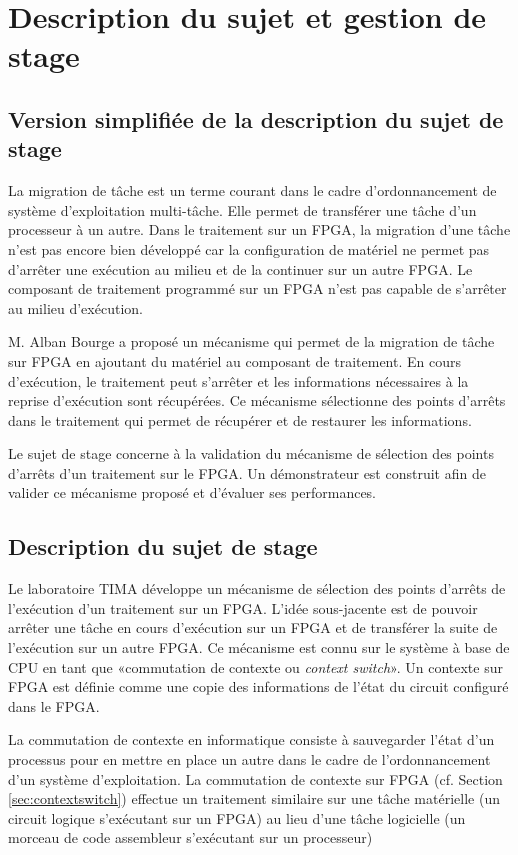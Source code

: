 \chapter{Description du sujet et gestion de stage}
\label{chap:sujet}
\OnehalfSpacing
\section{Version simplifiée de la description du sujet de stage}

La migration de tâche est un terme courant dans le cadre d'ordonnancement 
de système d'exploitation multi-tâche. Elle permet de transférer une tâche
d'un processeur à un autre. Dans le traitement sur un FPGA, la migration d'une tâche
n'est pas encore bien développé car la configuration de matériel ne permet pas
d'arrêter une exécution au milieu et de la continuer sur un autre FPGA. Le composant
de traitement programmé sur un FPGA n'est pas capable de s'arrêter au milieu d'exécution.

M. Alban Bourge a proposé un mécanisme qui permet de la migration de tâche sur
FPGA en ajoutant du matériel au composant de traitement. 
En cours d'exécution, le traitement peut s'arrêter et les informations nécessaires
à la reprise d'exécution sont récupérées. Ce mécanisme sélectionne des points d'arrêts
dans le traitement qui permet de récupérer et de restaurer les informations.

Le sujet de stage concerne à la validation du mécanisme de sélection des points d'arrêts d'un traitement
sur le FPGA. Un démonstrateur est construit afin de valider ce mécanisme proposé et d'évaluer
ses performances.

\section{Description du sujet de stage}
\label{sec:sujet}

Le laboratoire TIMA développe un mécanisme de sélection des points
d'arrêts de l'exécution d'un traitement sur un FPGA. L'idée sous-jacente
est de pouvoir arrêter une tâche en cours d'exécution sur un FPGA et de transférer la suite de
l'exécution sur un autre FPGA. Ce mécanisme est connu sur le système à base de CPU 
en tant que «commutation de contexte ou \emph{context switch}».
Un contexte sur FPGA est définie comme une copie des informations de l'état du circuit configuré dans le FPGA.

La commutation de contexte en informatique consiste à sauvegarder
l'état d'un processus pour en mettre en place un autre dans le cadre de l'ordonnancement 
d'un système d'exploitation. La commutation de contexte sur FPGA (cf. Section \ref{sec:contextswitch}) 
effectue un traitement similaire sur une tâche matérielle (un circuit logique s'exécutant sur un FPGA) 
au lieu d'une tâche logicielle (un morceau de code assembleur s'exécutant sur un processeur)

